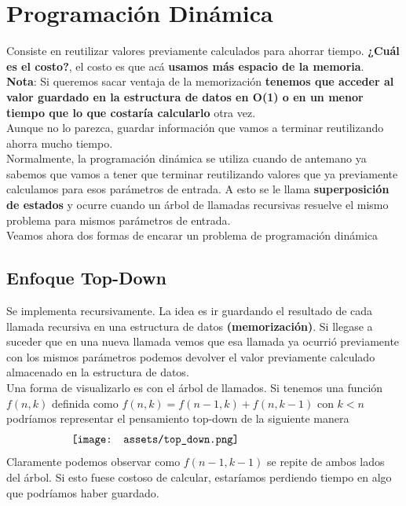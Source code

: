\documentclass[10pt,a4paper]{article}
\begin{document}
\section*{Programación Dinámica}
Consiste en reutilizar valores previamente calculados para ahorrar tiempo. \textbf{¿Cuál es el costo?}, el costo es que acá \textbf{usamos más espacio de la memoria}. \\

\textbf{Nota}: Si queremos sacar ventaja de la memorización \textbf{tenemos que acceder al valor guardado en la estructura de datos en O(1) o en un menor tiempo que lo que costaría calcularlo} otra vez. \\

Aunque no lo parezca, guardar información que vamos a terminar reutilizando ahorra mucho tiempo. \\

Normalmente, la programación dinámica se utiliza cuando de antemano ya sabemos que vamos a tener que terminar reutilizando valores que ya previamente calculamos para esos parámetros de entrada. A esto se le llama \textbf{superposición de estados} y ocurre cuando un árbol de llamadas recursivas resuelve el mismo problema para mismos parámetros de entrada. \\

Veamos ahora dos formas de encarar un problema de programación dinámica 

\subsection*{Enfoque Top-Down} 
Se implementa recursivamente. La idea es ir guardando el resultado de cada llamada recursiva en una estructura de datos \textbf{(memorización)}. Si llegase a suceder que en una nueva llamada vemos que esa llamada ya ocurrió previamente con los mismos parámetros podemos devolver el valor previamente calculado almacenado en la estructura de datos.  \\ 

Una forma de visualizarlo es con el árbol de llamados. Si tenemos una función $f(n, k)$ definida como $f(n, k) = f(n-1, k) + f(n, k-1)$ con $k<n$ podríamos representar el pensamiento top-down de la siguiente manera
\[\begin{minipage}[b]{0.7\textwidth}
    \texttt{[image: assets/top\_down.png]}
\end{minipage}\]
Claramente podemos observar como $f(n-1, k-1)$ se repite de ambos lados del árbol. Si esto fuese costoso de calcular, estaríamos perdiendo tiempo en algo que podríamos haber guardado. \\
\end{document}
